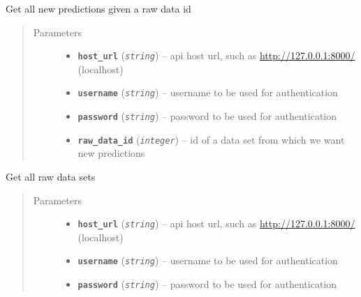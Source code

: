 \documentclass[letterpaper,10pt,english]{sphinxmanual}
\begin{document}
\begin{fulllineitems}
\label{modules/views:test_files.post_api.get_prediction_new}
Get all new predictions given a raw data id
\begin{quote}\begin{description}
\item[{Parameters}] \leavevmode\begin{itemize}
\item {} 
\textbf{\texttt{host\_url}} (\emph{\texttt{string}}) -- api host url, such as \url{http://127.0.0.1:8000/} (localhost)

\item {} 
\textbf{\texttt{username}} (\emph{\texttt{string}}) -- username to be used for authentication

\item {} 
\textbf{\texttt{password}} (\emph{\texttt{string}}) -- password to be used for authentication

\item {} 
\textbf{\texttt{raw\_data\_id}} (\emph{\texttt{integer}}) -- id of a data set from which we want new predictions

\end{itemize}

\end{description}\end{quote}

\end{fulllineitems}


\begin{fulllineitems}
\label{modules/views:test_files.post_api.get_raw_data}
Get all raw data sets
\begin{quote}\begin{description}
\item[{Parameters}] \leavevmode\begin{itemize}
\item {} 
\textbf{\texttt{host\_url}} (\emph{\texttt{string}}) -- api host url, such as \url{http://127.0.0.1:8000/} (localhost)

\item {} 
\textbf{\texttt{username}} (\emph{\texttt{string}}) -- username to be used for authentication

\item {} 
\textbf{\texttt{password}} (\emph{\texttt{string}}) -- password to be used for authentication

\end{itemize}

\end{description}\end{quote}

\end{fulllineitems}
\end{document}
